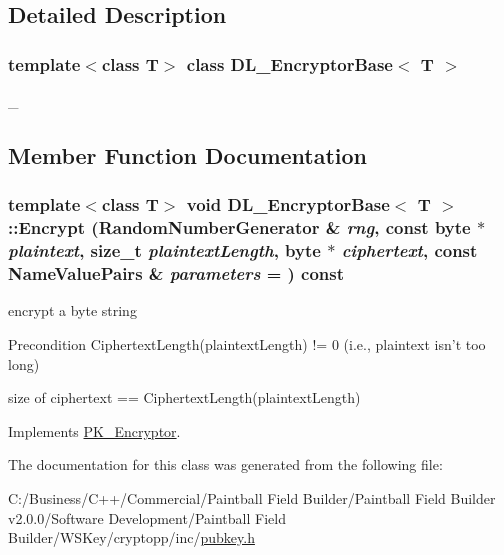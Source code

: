\subsection{Detailed Description}
\subsubsection*{template$<$class T$>$ class DL\_\-EncryptorBase$<$ T $>$}

\_\- 

\subsection{Member Function Documentation}
\hypertarget{class_d_l___encryptor_base_ac902fd1973e468608758a99b3dc07e6a}{
\subsubsection[{Encrypt}]{\setlength{\rightskip}{0pt plus 5cm}template$<$class T$>$ void {\bf DL\_\-EncryptorBase}$<$ T $>$::Encrypt ({\bf RandomNumberGenerator} \& {\em rng}, \/  const byte $\ast$ {\em plaintext}, \/  size\_\-t {\em plaintextLength}, \/  byte $\ast$ {\em ciphertext}, \/  const {\bf NameValuePairs} \& {\em parameters} = {}) const}}
\label{class_d_l___encryptor_base_ac902fd1973e468608758a99b3dc07e6a}


encrypt a byte string \begin{DoxyPrecond}{Precondition}
CiphertextLength(plaintextLength) != 0 (i.e., plaintext isn't too long) 

size of ciphertext == CiphertextLength(plaintextLength) 
\end{DoxyPrecond}


Implements \hyperlink{class_p_k___encryptor_aecb519bc1cb0b261698be999bb5c8961}{PK\_\-Encryptor}.

The documentation for this class was generated from the following file:\begin{DoxyCompactItemize}
\item 
C:/Business/C++/Commercial/Paintball Field Builder/Paintball Field Builder v2.0.0/Software Development/Paintball Field Builder/WSKey/cryptopp/inc/\hyperlink{pubkey_8h}{pubkey.h}\end{DoxyCompactItemize}
